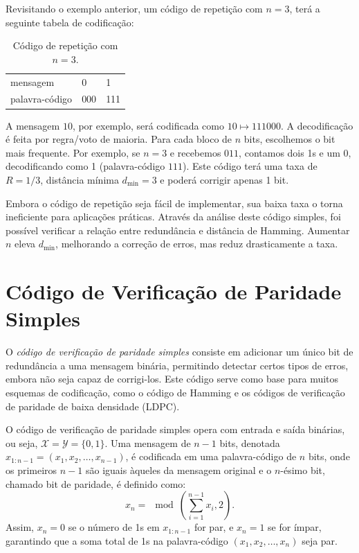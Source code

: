 \begin{example}[Correção de erros em um código de repetição com $n=3$]
  Revisitando o exemplo anterior, um código de repetição com $n=3$,
  terá a seguinte tabela de codificação:
  \begin{table}[h]
    \centering
    \begin{tabular}{lll}
      mensagem & 0 & 1 \\
      palavra-código & 000 & 111 
    \end{tabular}
    \caption{Código de repetição com $n = 3$.}
    \label{tab:repetition_code}
  \end{table}

  \noindent A mensagem $10$, por exemplo, será codificada como $10 \mapsto 111000$.
  A decodificação é feita por regra/voto de maioria. 
  Para cada bloco de $n$ bits, escolhemos o bit mais frequente. 
  Por exemplo, se $n = 3$ e recebemos $011$, contamos dois 1s e um 0, 
  decodificando como 1 (palavra-código $111$).
  Este código terá uma taxa de $R = 1/3$, distância mínima $d_{\text{min}} = 3$ e
  poderá corrigir apenas 1 bit.
\end{example}


Embora o código de repetição seja fácil de implementar, sua baixa taxa o torna
ineficiente para aplicações práticas. 
Através da análise deste código simples, foi possível verificar a
relação entre redundância e distância de Hamming. Aumentar $n$ eleva 
$d_{\text{min}}$, melhorando a correção de erros, mas reduz drasticamente a taxa. 








\section{Código de Verificação de Paridade Simples}

O \emph{código de verificação de paridade simples} consiste em adicionar um único bit
de redundância a uma mensagem binária, permitindo detectar certos tipos de
erros, embora não seja capaz de corrigi-los. Este código serve como base para
muitos esquemas de codificação, como o código de Hamming e os códigos de
verificação de paridade de baixa densidade (LDPC).

\begin{definition}
O código de verificação de paridade simples opera com entrada e saída binárias, ou seja, 
$\mathcal{X} = \mathcal{Y} = \{0, 1\}$. Uma mensagem de $n-1$ bits, denotada $x_{1:n-1} = (x_1, x_2, \dots, x_{n-1})$, 
é codificada em uma palavra-código de $n$ bits, onde os primeiros $n-1$ são iguais àqueles da mensagem original
e o $n$-ésimo bit, chamado bit de paridade, é definido como:
\begin{equation}
x_n = \mod \left( \sum_{i=1}^{n-1} x_i, 2 \right).
\end{equation}
Assim, $x_n = 0$ se o número de 1s em $x_{1:n-1}$ for par, e $x_n = 1$ se for ímpar, 
garantindo que a soma total de 1s na palavra-código $(x_1, x_2, \dots, x_n)$ seja par.
\end{definition}

